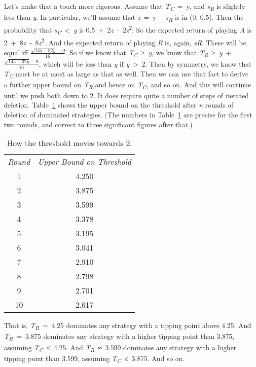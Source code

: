 \documentclass[
  10pt,
  letterpaper,
  twoside]{scrbook}
\begin{document}
Let's make that a touch more rigorous. Assume that
\emph{T\textsubscript{C}}~=~y, and \emph{s\textsubscript{R}} is slightly
less than \emph{y}. In particular, we'll assume that
\emph{z}~=~y~-~\emph{s\textsubscript{R}} is in (0, 0.5). Then the
probability that \emph{s\textsubscript{C}}~\textless~\emph{y} is
0.5~+~2\emph{z}~‑~2\emph{z}\textsuperscript{2}. So the expected return
of playing \emph{A} is 2~+~8\emph{z}~‑~8\emph{z}\textsuperscript{2}. And
the expected return of playing \emph{B} is, again, \emph{sR}. These will
be equal iff \(\frac{\sqrt{145-32y}-9}{16}\). So if we know that
\emph{T\textsubscript{C}}~≥~\emph{y}, we know that
\emph{T\textsubscript{R}}~≥~\emph{y}~+~\(\frac{\sqrt{145-32y}-9}{16}\),
which will be less than \emph{y} if \emph{y}~\textgreater~2. Then by
symmetry, we know that \emph{T\textsubscript{C}} must be at most as
large as that as well. Then we can use that fact to derive a further
upper bound on \emph{T\textsubscript{R}} and hence on
\emph{T\textsubscript{C}}, and so on. And this will continue until we
push both down to 2. It does require quite a number of steps of iterated
deletion. Table~\ref{tbl-threshold} shows the upper bound on the
threshold after \emph{n} rounds of deletion of dominated strategies.
(The numbers in Table~\ref{tbl-threshold} are precise for the first two
rounds, and correct to three significant figures after that.)

\begin{longtable}[]{@{}cc@{}}
\caption{How the threshold moves towards
2.}\label{tbl-threshold}\tabularnewline
\toprule\noalign{}
\endfirsthead
\endhead
\bottomrule\noalign{}
\endlastfoot
\emph{Round} & \emph{Upper Bound on Threshold} \\
1 & 4.250 \\
2 & 3.875 \\
3 & 3.599 \\
4 & 3.378 \\
5 & 3.195 \\
6 & 3.041 \\
7 & 2.910 \\
8 & 2.798 \\
9 & 2.701 \\
10 & 2.617 \\
\end{longtable}

That is, \emph{T\textsubscript{R}}~=~4.25 dominates any strategy with a
tipping point above 4.25. And \emph{T\textsubscript{R}}~=~3.875
dominates any strategy with a higher tipping point than 3.875, assuming
\emph{T\textsubscript{C}}~≤~4.25. And \emph{T\textsubscript{R}}~≈~3.599
dominates any strategy with a higher tipping point than 3.599, assuming
\emph{T\textsubscript{C}}~≤~3.875. And so on.
\end{document}
